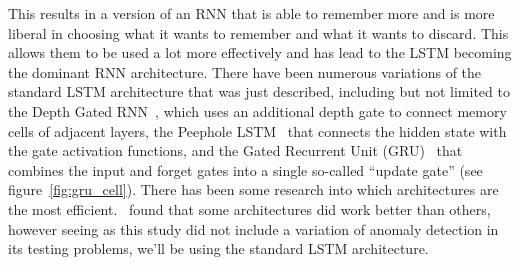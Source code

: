 This results in a version of an RNN that is able to remember more and is more liberal in choosing what it wants to remember and what it wants to discard. This allows them to be used a lot more effectively and has lead to the LSTM becoming the dominant RNN architecture. There have been numerous variations of the standard LSTM architecture that was just described, including but not limited to the Depth Gated RNN~\cite{yao2015depth}, which uses an additional depth gate to connect memory cells of adjacent layers, the Peephole LSTM~\cite{gers2002learning} that connects the hidden state with the gate activation functions, and the Gated Recurrent Unit (GRU)~\cite{cho2014learning} that combines the input and forget gates into a single so-called \enquote{update gate} (see figure~\ref{fig:gru_cell}). There has been some research into which architectures are the most efficient.~\cite{jozefowicz2015empirical} found that some architectures did work better than others, however seeing as this study did not include a variation of anomaly detection in its testing problems, we'll be using the standard LSTM architecture.